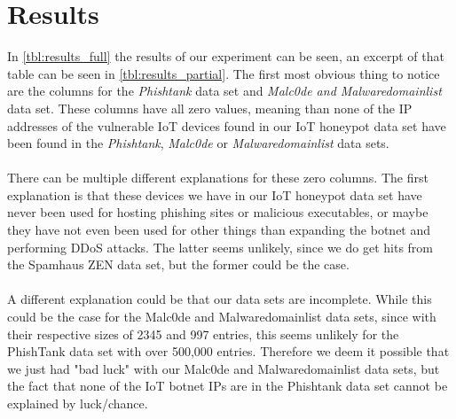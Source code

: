 \documentclass[a4paper,10pt]{article}
\begin{document}

\section{Results} \label{sec:results}

In \autoref{tbl:results_full} the results of our experiment can be seen, an excerpt of that table can be seen in 
\autoref{tbl:results_partial}. The first most obvious thing to notice are the
columns for the \textit{Phishtank} data set and \textit{Malc0de and Malwaredomainlist} data set. These columns 
have all zero values, meaning than none of the IP addresses of the vulnerable IoT devices found in our IoT honeypot 
data set have been found in the \textit{Phishtank}, \textit{Malc0de} or \textit{Malwaredomainlist} data sets. 
\\\\
There can be multiple different explanations for these zero columns. The first explanation is that these devices we have
in our IoT honeypot data set have never been used for hosting phishing sites or malicious executables, or maybe they have
not even been used for other things than expanding the botnet and performing DDoS attacks. The latter seems unlikely, 
since we do get hits from the Spamhaus ZEN data set, but the former could be the case. 
\\\\
A different explanation could be that our data sets are incomplete. While this could be the case  for the Malc0de and
Malwaredomainlist data sets, since with their respective sizes of 2345 and 997 entries, this seems unlikely for the
PhishTank data set with over 500,000 entries.  Therefore we deem it possible that we just had "bad luck" with our
Malc0de and Malwaredomainlist data sets, but the fact that none of the IoT botnet IPs are in the Phishtank data set 
cannot be explained by luck/chance.
\end{document}
